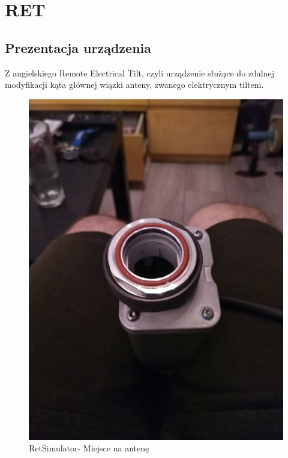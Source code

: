 \chapter{RET}
	\section{Prezentacja urządzenia}
		Z angielskiego Remote Electrical Tilt, czyli urządzenie służące do zdalnej modyfikacji kąta głównej wiązki anteny, zwanego elektrycznym tiltem.
		\autocite{KATHREIN_RET_1}
		\begin{figure}[h!]
		\centering
		\includegraphics[scale=0.4]{Obrazki/RET_1.png}
		\caption{RetSimulator- Miejsce na antenę}
		\end{figure}

